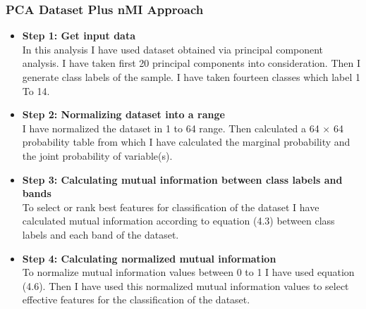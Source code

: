 \documentclass[document.tex]{subfiles}
\begin{document}
\subsubsection{PCA Dataset Plus nMI Approach}
\begin{itemize}
	\item \textbf{Step 1: Get input data}\\
	In this analysis I have used dataset obtained via principal component analysis. I have taken first 20 principal components into consideration. Then I generate class labels of the sample. I have taken
	fourteen classes which label 1 To 14.
	\item \textbf{Step 2: Normalizing dataset into a range}\\
	I have normalized the dataset in 1 to 64 range. Then calculated a 64 $\times$ 64 probability table from which I have calculated the marginal probability and the joint probability of variable(s). 
	\item \textbf{Step 3: Calculating mutual information between class labels and bands}\\
	To select or rank best features for classification of the dataset I have calculated mutual information according to equation (4.3) between class labels and each band of the dataset.
	\item \textbf{Step 4: Calculating normalized mutual information}\\
	To normalize mutual information values between 0 to 1 I have used equation (4.6). Then I have used this normalized mutual information values to select effective features for the classification of the dataset. 
\end{itemize}
\end{document}
